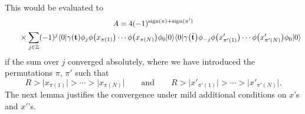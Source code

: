 \documentclass[pdftex]{sigma}
\numberwithin{equation}{section}
\begin{document}
This would be evaluated to
\begin{gather}
A = 4 (-1)^{\mathrm{sign}(\pi)+\mathrm{sign}(\pi')}\label{pre-Hirotabis}
\\ \hphantom{A =}{}
 \times\sum_{j\in \mathbb{Z}}(-1)^j
\langle 0|\gamma(\mathbf{t}) \phi_j \phi\bigl(x_{\pi(1)}\bigr)\cdots \phi\bigl(x_{\pi(N)}\bigr)
\phi_0|0\rangle
\langle 0|\gamma\bigl(\tilde{\mathbf{t}}\bigr) \phi_{-j} \phi\bigl(x_{\pi'(1)}'\bigr)\cdots \phi\bigl(x_{\pi'(N)}'\bigr)
\phi_0|0\rangle\nonumber
\end{gather}
if the sum over $j$ converged absolutely, where we have introduced the permutations $\pi$, $\pi'$ such that
\[
R>\bigl|x_{\pi(1)}\bigr|>\cdots >\bigl|x_{\pi(N)}\bigr| \qquad \text{and} \qquad R>\bigl|x'_{\pi'(1)}\bigr|>\cdots >\bigl|x'_{\pi'(N)}\bigr|.
\]
The next lemma justifies the convergence under mild additional conditions on $x$'s and $x'$'s.
\end{document}
